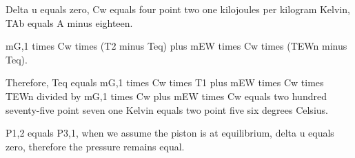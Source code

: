 Delta u equals zero, Cw equals four point two one kilojoules per kilogram Kelvin, TAb equals A minus eighteen.

mG,1 times Cw times (T2 minus Teq) plus mEW times Cw times (TEWn minus Teq).

Therefore, Teq equals mG,1 times Cw times T1 plus mEW times Cw times TEWn divided by mG,1 times Cw plus mEW times Cw equals two hundred seventy-five point seven one Kelvin equals two point five six degrees Celsius.

P1,2 equals P3,1, when we assume the piston is at equilibrium, delta u equals zero, therefore the pressure remains equal.